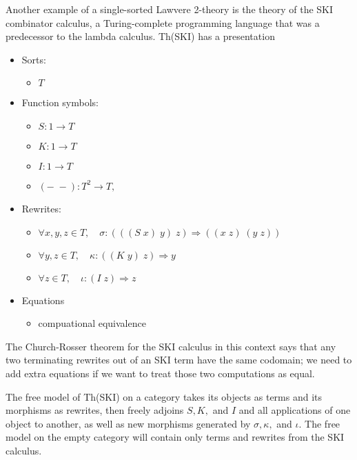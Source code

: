 \documentclass{article}
\newcommand{\maps}{\colon}
\begin{document}
Another example of a single-sorted Lawvere 2-theory is the theory of the SKI combinator calculus, a Turing-complete programming language that was a predecessor to the lambda calculus.  Th(SKI) has a presentation
\begin{center}
  \begin{itemize}
    \item Sorts:
    \begin{itemize}
      \item $T$
    \end{itemize}
    \item Function symbols:
    \begin{itemize}
      \item $S\maps 1 \to T$
      \item $K\maps 1 \to T$
      \item $I\maps 1 \to T$
      \item $(-\;-)\maps T^2 \to T,$
    \end{itemize}
    \item Rewrites:
    \begin{itemize}
      \item $\forall x,y,z \in T, \quad \sigma \maps (((S\; x)\; y)\; z) \Rightarrow ((x\; z)\; (y\; z))$
      \item $\forall y,z \in T, \quad \kappa \maps ((K\; y)\; z) \Rightarrow y$
      \item $\forall z \in T, \quad \iota \maps (I\; z) \Rightarrow z$
    \end{itemize}
    \item Equations
    \begin{itemize}
      \item compuational equivalence
    \end{itemize}
  \end{itemize}
\end{center}
The Church-Rosser theorem for the SKI calculus in this context says that any two terminating rewrites out of an SKI term have the same codomain; we need to add extra equations if we want to treat those two computations as equal.

The free model of Th(SKI) on a category takes its objects as terms and its morphisms as rewrites, then freely adjoins $S,K,$ and $I$ and all applications of one object to another, as well as new morphisms generated by $\sigma,\kappa,$ and $\iota.$  The free model on the empty category will contain only terms and rewrites from the SKI calculus.
\end{document}
